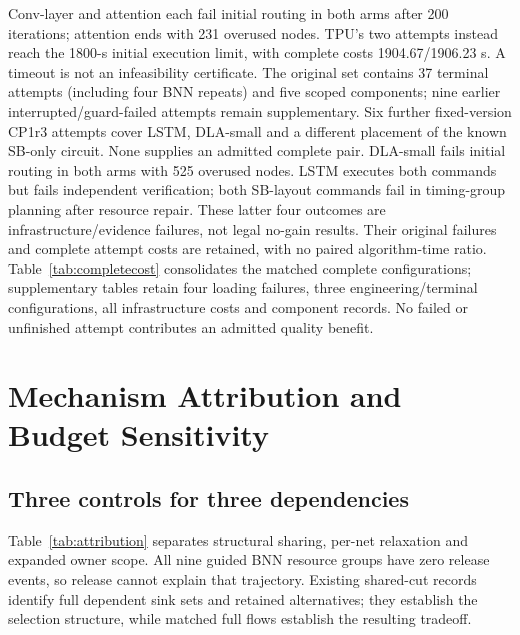 \documentclass[conference,10pt]{IEEEtran}
\begin{document}
Conv-layer and attention each fail initial routing in both arms after 200 iterations; attention ends with 231 overused nodes. TPU's two attempts instead reach the 1800-s initial execution limit, with complete costs 1904.67/1906.23 s. A timeout is not an infeasibility certificate. The original set contains 37 terminal attempts (including four BNN repeats) and five scoped components; nine earlier interrupted/guard-failed attempts remain supplementary. Six further fixed-version CP1r3 attempts cover LSTM, DLA-small and a different placement of the known SB-only circuit. None supplies an admitted complete pair. DLA-small fails initial routing in both arms with 525 overused nodes. LSTM executes both commands but fails independent verification; both SB-layout commands fail in timing-group planning after resource repair. These latter four outcomes are infrastructure/evidence failures, not legal no-gain results. Their original failures and complete attempt costs are retained, with no paired algorithm-time ratio. Table~\ref{tab:completecost} consolidates the matched complete configurations; supplementary tables retain four loading failures, three engineering/terminal configurations, all infrastructure costs and component records. No failed or unfinished attempt contributes an admitted quality benefit.

\section{Mechanism Attribution and Budget Sensitivity}
\subsection{Three controls for three dependencies}
Table~\ref{tab:attribution} separates structural sharing, per-net relaxation and expanded owner scope. All nine guided BNN resource groups have zero release events, so release cannot explain that trajectory. Existing shared-cut records identify full dependent sink sets and retained alternatives; they establish the selection structure, while matched full flows establish the resulting tradeoff.
\end{document}
